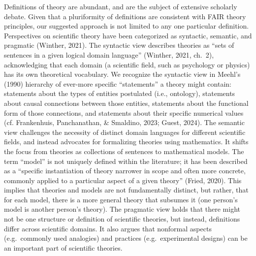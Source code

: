 \documentclass[
  man, noextraspace,floatsintext]{apa6}
\begin{document}
Definitions of theory are abundant, and are the subject of extensive scholarly debate.
Given that a pluriformity of definitions are consistent with FAIR theory principles,
our suggested approach is not limited to any one particular definition.
Perspectives on scientific theory have been categorized as syntactic, semantic, and pragmatic (Winther, 2021).
The syntactic view describes theories as ``sets of sentences in a given logical domain language'' (Winther, 2021, ch.~2),
acknowledging that each domain (a scientific field, such as psychology or physics) has its own theoretical vocabulary.
We recognize the syntactic view in Meehl's (1990) hierarchy of ever-more specific ``statements'' a theory might contain:
statements about the types of entities postulated (i.e., ontology),
statements about causal connections between those entities,
statements about the functional form of those connections,
and statements about their specific numerical values (cf. Frankenhuis, Panchanathan, \& Smaldino, 2023; Guest, 2024).
The semantic view challenges the necessity of distinct domain languages for different scientific fields, and instead advocates for formalizing theories using mathematics.
It shifts the focus from theories as collections of sentences to mathematical models.
The term ``model'' is not uniquely defined within the literature;
it has been described as a ``specific instantiation of theory narrower in scope and often more concrete, commonly applied to a particular aspect of a given theory'' (Fried, 2020).
This implies that theories and models are not fundamentally distinct, but rather, that for each model, there is a more general theory that subsumes it (one person's model is another person's theory).
The pragmatic view holds that there might not be one structure or definition of scientific theories, but instead, definitions differ across scientific domains.
It also argues that nonformal aspects (e.g.~commonly used analogies) and practices (e.g.~experimental designs) can be an important part of scientific theories.
\end{document}
